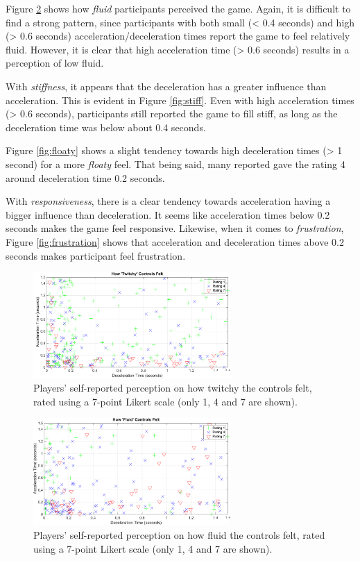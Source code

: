 Figure \ref{fig:fluid} shows how \textit{fluid} participants perceived the game. Again, it is difficult to find a strong pattern, since participants with both small (< 0.4 seconds) and high (> 0.6 seconds) acceleration/deceleration times report the game to feel relatively fluid. However, it is clear that high acceleration time (> 0.6 seconds) results in a perception of low fluid.

With \textit{stiffness}, it appears that the deceleration has a greater influence than acceleration. This is evident in Figure \ref{fig:stiff}. Even with high acceleration times (> 0.6 seconds), participants still reported the game to fill stiff, as long as the deceleration time was below about 0.4 seconds.

Figure \ref{fig:floaty} shows a slight tendency towards high deceleration times (> 1 second) for a more \textit{floaty} feel. That being said, many reported gave the rating 4 around deceleration time 0.2 seconds.

With \textit{responsiveness}, there is a clear tendency towards acceleration having a bigger influence than deceleration. It seems like acceleration times below 0.2 seconds makes the game feel responsive. Likewise, when it comes to \textit{frustration}, Figure \ref{fig:frustration} shows that acceleration and deceleration times above 0.2 seconds makes participant feel frustration.

\begin{figure}[htbp]
\centering
\includegraphics[width=0.67\textwidth]{Pics/Classes/Twitchy_classes}
\caption{Players' self-reported perception on how twitchy the controls felt, rated using a 7-point Likert scale (only 1, 4 and 7 are shown).}
\label{fig:twitchy}
\end{figure}

\begin{figure}[htbp]
\centering
\includegraphics[width=0.67\textwidth]{Pics/Classes/Fluid_classes}
\caption{Players' self-reported perception on how fluid the controls felt, rated using a 7-point Likert scale (only 1, 4 and 7 are shown).}
\label{fig:fluid}
\end{figure}

